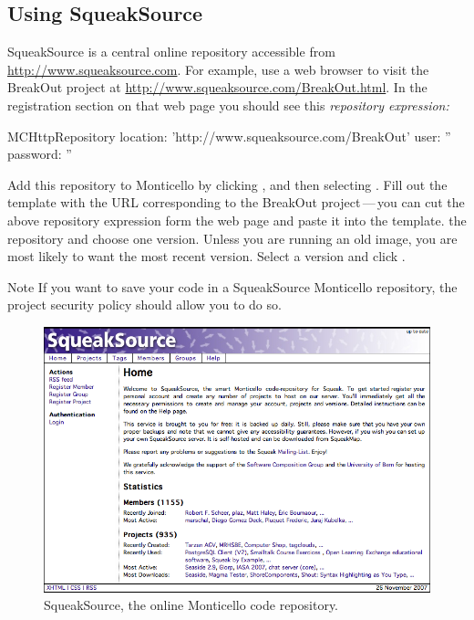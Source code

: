 \documentclass[a4paper,10pt,twoside]{book}
\begin{document}
\subsection{Using SqueakSource}

SqueakSource is a central online repository accessible from \url{http://www.squeaksource.com}. For example, use a web browser to visit the BreakOut project at \url{http://www.squeaksource.com/BreakOut.html}. In the registration section on that web page you should see this \emph{repository expression:}

\begin{code}{}
MCHttpRepository
    location: 'http://www.squeaksource.com/BreakOut'
    user: ''
    password: ''
\end{code}

Add this repository to Monticello by clicking , and then selecting . Fill out the template with the URL corresponding to the BreakOut project\,---\,you can cut the above repository expression form the web page and paste it into the template.
 the repository and choose one version. 
Unless you are running an old image, you are most likely to want the most recent version. Select a version and click .

Note If you want to save your code in a SqueakSource Monticello repository, the project security policy should allow you to do so.


\begin{figure}[ht]\centering
	\includegraphics[width=.75\linewidth]{squeaksource2}
	\caption{SqueakSource, the online Monticello code repository.}
\end{figure}
\end{document}
